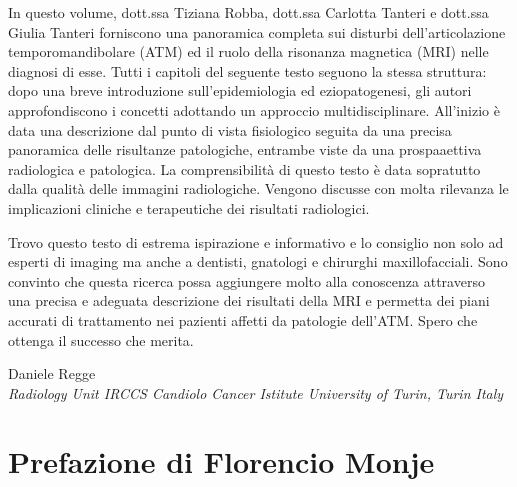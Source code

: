 \documentclass[leqno,10pt,twocolumn,a4paper]{article}
\begin{document}
	\vspace*{0.5cm}
	In questo volume, dott.ssa Tiziana Robba, dott.ssa Carlotta Tanteri e dott.ssa Giulia Tanteri forniscono una panoramica completa sui disturbi dell'articolazione temporomandibolare (ATM) ed il ruolo della risonanza magnetica (MRI) nelle diagnosi di esse.
	Tutti i capitoli del seguente testo seguono la stessa struttura: dopo una breve introduzione sull'epidemiologia ed eziopatogenesi, gli autori approfondiscono i concetti adottando un approccio multidisciplinare. All'inizio è data una descrizione dal punto di vista
	fisiologico seguita da una precisa panoramica delle risultanze patologiche, entrambe viste da una prospaaettiva radiologica e patologica. La comprensibilità di questo testo è data sopratutto dalla qualità delle immagini radiologiche. Vengono discusse con 
	molta rilevanza le implicazioni cliniche e terapeutiche dei risultati radiologici.\par Trovo questo testo di estrema ispirazione e informativo e lo consiglio non solo ad esperti di imaging ma anche a dentisti, gnatologi e chirurghi maxillofacciali. Sono convinto
	che questa ricerca possa aggiungere molto alla conoscenza attraverso una precisa e adeguata descrizione dei risultati della MRI e permetta dei piani accurati di trattamento nei pazienti affetti da patologie dell'ATM. Spero che ottenga il successo
	che merita.
	\begin{flushright}
		Daniele Regge\\
		\textit{\footnotesize{Radiology Unit IRCCS Candiolo Cancer Istitute University of Turin, Turin Italy}}
	\end{flushright}
	
	\newpage
	
	\thispagestyle{plain}
	
	\section*{Prefazione di Florencio Monje}
	
\end{document}
